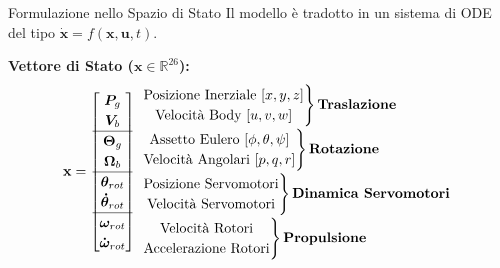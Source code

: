 \documentclass[aspectratio=169]{beamer} %
\begin{document}
\begin{frame}{Formulazione nello Spazio di Stato}
    Il modello è tradotto in un sistema di ODE del tipo $\dot{\mathbf{x}} = f(\mathbf{x}, \mathbf{u}, t)$.
    
    \vspace{0.5cm}
    \textbf{Vettore di Stato ($\mathbf{x} \in \mathbb{R}^{26}$):}
    \begin{equation}
        \mathbf{x} = 
        {
            \renewcommand{\arraystretch}{1.2}
        \begin{bmatrix}
            \bm{P}_g \\ \bm{V}_b \\ \hline
            \bm{\Theta}_g \\ \bm{\Omega}_b \\ \hline
            \bm{\theta}_{rot} \\ \bm{\dot{\theta}}_{rot} \\ \hline
            \bm{\omega}_{rot} \\ \bm{\dot{\omega}}_{rot}
        \end{bmatrix}
        }
        \begin{array}{l}
            \left. \begin{matrix} \text{Posizione Inerziale } [x,y,z] \\ \text{Velocità Body } [u,v,w] \end{matrix} \right\} \text{\textbf{Traslazione}} \\[1em]
            \left. \begin{matrix} \text{Assetto Eulero } [\phi,\theta,\psi] \\ \text{Velocità Angolari } [p,q,r] \end{matrix} \right\} \text{\textbf{Rotazione}} \\[1em]
            \left. \begin{matrix} \text{Posizione Servomotori} \\ \text{Velocità Servomotori} \end{matrix} \right\} \text{\textbf{Dinamica Servomotori}} \\[1em]
            \left. \begin{matrix} \text{Velocità Rotori} \\ \text{Accelerazione Rotori} \end{matrix} \right\} \text{\textbf{Propulsione}}
        \end{array}
    \end{equation}
\end{frame}
\end{document}
